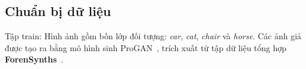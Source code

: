 \subsection{Chuẩn bị dữ liệu}
%
Tập \gls{train}: Hình ảnh gồm bốn lớp đối tượng: \textit{car}, \textit{cat}, \textit{chair} và \textit{horse}. Các ảnh giả được tạo ra bằng mô hình sinh ProGAN~\cite{karras2018progressive}, trích xuất từ tập dữ liệu tổng hợp \textbf{ForenSynths}~\cite{Wang2019CNNGeneratedIA}.
%
%

